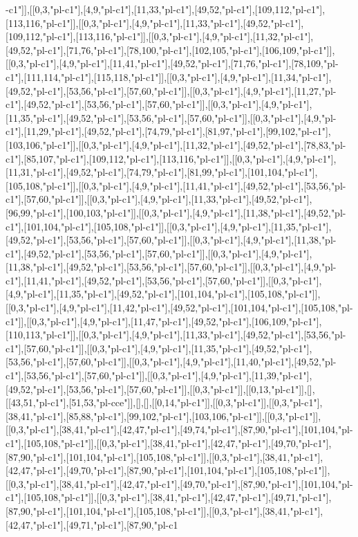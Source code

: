 -c1"]],[[0,3,"pl-c1"],[4,9,"pl-c1"],[11,33,"pl-c1"],[49,52,"pl-c1"],[109,112,"pl-c1"],[113,116,"pl-c1"]],[[0,3,"pl-c1"],[4,9,"pl-c1"],[11,33,"pl-c1"],[49,52,"pl-c1"],[109,112,"pl-c1"],[113,116,"pl-c1"]],[[0,3,"pl-c1"],[4,9,"pl-c1"],[11,32,"pl-c1"],[49,52,"pl-c1"],[71,76,"pl-c1"],[78,100,"pl-c1"],[102,105,"pl-c1"],[106,109,"pl-c1"]],[[0,3,"pl-c1"],[4,9,"pl-c1"],[11,41,"pl-c1"],[49,52,"pl-c1"],[71,76,"pl-c1"],[78,109,"pl-c1"],[111,114,"pl-c1"],[115,118,"pl-c1"]],[[0,3,"pl-c1"],[4,9,"pl-c1"],[11,34,"pl-c1"],[49,52,"pl-c1"],[53,56,"pl-c1"],[57,60,"pl-c1"]],[[0,3,"pl-c1"],[4,9,"pl-c1"],[11,27,"pl-c1"],[49,52,"pl-c1"],[53,56,"pl-c1"],[57,60,"pl-c1"]],[[0,3,"pl-c1"],[4,9,"pl-c1"],[11,35,"pl-c1"],[49,52,"pl-c1"],[53,56,"pl-c1"],[57,60,"pl-c1"]],[[0,3,"pl-c1"],[4,9,"pl-c1"],[11,29,"pl-c1"],[49,52,"pl-c1"],[74,79,"pl-c1"],[81,97,"pl-c1"],[99,102,"pl-c1"],[103,106,"pl-c1"]],[[0,3,"pl-c1"],[4,9,"pl-c1"],[11,32,"pl-c1"],[49,52,"pl-c1"],[78,83,"pl-c1"],[85,107,"pl-c1"],[109,112,"pl-c1"],[113,116,"pl-c1"]],[[0,3,"pl-c1"],[4,9,"pl-c1"],[11,31,"pl-c1"],[49,52,"pl-c1"],[74,79,"pl-c1"],[81,99,"pl-c1"],[101,104,"pl-c1"],[105,108,"pl-c1"]],[[0,3,"pl-c1"],[4,9,"pl-c1"],[11,41,"pl-c1"],[49,52,"pl-c1"],[53,56,"pl-c1"],[57,60,"pl-c1"]],[[0,3,"pl-c1"],[4,9,"pl-c1"],[11,33,"pl-c1"],[49,52,"pl-c1"],[96,99,"pl-c1"],[100,103,"pl-c1"]],[[0,3,"pl-c1"],[4,9,"pl-c1"],[11,38,"pl-c1"],[49,52,"pl-c1"],[101,104,"pl-c1"],[105,108,"pl-c1"]],[[0,3,"pl-c1"],[4,9,"pl-c1"],[11,35,"pl-c1"],[49,52,"pl-c1"],[53,56,"pl-c1"],[57,60,"pl-c1"]],[[0,3,"pl-c1"],[4,9,"pl-c1"],[11,38,"pl-c1"],[49,52,"pl-c1"],[53,56,"pl-c1"],[57,60,"pl-c1"]],[[0,3,"pl-c1"],[4,9,"pl-c1"],[11,38,"pl-c1"],[49,52,"pl-c1"],[53,56,"pl-c1"],[57,60,"pl-c1"]],[[0,3,"pl-c1"],[4,9,"pl-c1"],[11,41,"pl-c1"],[49,52,"pl-c1"],[53,56,"pl-c1"],[57,60,"pl-c1"]],[[0,3,"pl-c1"],[4,9,"pl-c1"],[11,35,"pl-c1"],[49,52,"pl-c1"],[101,104,"pl-c1"],[105,108,"pl-c1"]],[[0,3,"pl-c1"],[4,9,"pl-c1"],[11,42,"pl-c1"],[49,52,"pl-c1"],[101,104,"pl-c1"],[105,108,"pl-c1"]],[[0,3,"pl-c1"],[4,9,"pl-c1"],[11,47,"pl-c1"],[49,52,"pl-c1"],[106,109,"pl-c1"],[110,113,"pl-c1"]],[[0,3,"pl-c1"],[4,9,"pl-c1"],[11,33,"pl-c1"],[49,52,"pl-c1"],[53,56,"pl-c1"],[57,60,"pl-c1"]],[[0,3,"pl-c1"],[4,9,"pl-c1"],[11,35,"pl-c1"],[49,52,"pl-c1"],[53,56,"pl-c1"],[57,60,"pl-c1"]],[[0,3,"pl-c1"],[4,9,"pl-c1"],[11,40,"pl-c1"],[49,52,"pl-c1"],[53,56,"pl-c1"],[57,60,"pl-c1"]],[[0,3,"pl-c1"],[4,9,"pl-c1"],[11,39,"pl-c1"],[49,52,"pl-c1"],[53,56,"pl-c1"],[57,60,"pl-c1"]],[[0,3,"pl-c1"]],[[0,13,"pl-c1"]],[],[[43,51,"pl-c1"],[51,53,"pl-cce"]],[],[],[[0,14,"pl-c1"]],[[0,3,"pl-c1"]],[[0,3,"pl-c1"],[38,41,"pl-c1"],[85,88,"pl-c1"],[99,102,"pl-c1"],[103,106,"pl-c1"]],[[0,3,"pl-c1"]],[[0,3,"pl-c1"],[38,41,"pl-c1"],[42,47,"pl-c1"],[49,74,"pl-c1"],[87,90,"pl-c1"],[101,104,"pl-c1"],[105,108,"pl-c1"]],[[0,3,"pl-c1"],[38,41,"pl-c1"],[42,47,"pl-c1"],[49,70,"pl-c1"],[87,90,"pl-c1"],[101,104,"pl-c1"],[105,108,"pl-c1"]],[[0,3,"pl-c1"],[38,41,"pl-c1"],[42,47,"pl-c1"],[49,70,"pl-c1"],[87,90,"pl-c1"],[101,104,"pl-c1"],[105,108,"pl-c1"]],[[0,3,"pl-c1"],[38,41,"pl-c1"],[42,47,"pl-c1"],[49,70,"pl-c1"],[87,90,"pl-c1"],[101,104,"pl-c1"],[105,108,"pl-c1"]],[[0,3,"pl-c1"],[38,41,"pl-c1"],[42,47,"pl-c1"],[49,71,"pl-c1"],[87,90,"pl-c1"],[101,104,"pl-c1"],[105,108,"pl-c1"]],[[0,3,"pl-c1"],[38,41,"pl-c1"],[42,47,"pl-c1"],[49,71,"pl-c1"],[87,90,"pl-c1
